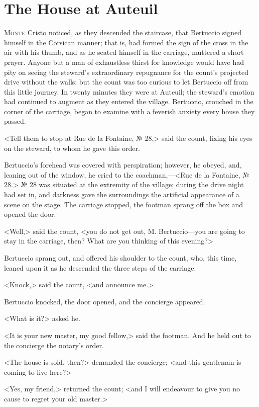 \chapter{The House at Auteuil} 

 \lettrine{M}{onte} Cristo noticed, as they descended the staircase, that Bertuccio signed himself in the Corsican manner; that is, had formed the sign of the cross in the air with his thumb, and as he seated himself in the carriage, muttered a short prayer. Anyone but a man of exhaustless thirst for knowledge would have had pity on seeing the steward's extraordinary repugnance for the count's projected drive without the walls; but the count was too curious to let Bertuccio off from this little journey. In twenty minutes they were at Auteuil; the steward's emotion had continued to augment as they entered the village. Bertuccio, crouched in the corner of the carriage, began to examine with a feverish anxiety every house they passed. 

 <Tell them to stop at Rue de la Fontaine, № 28,> said the count, fixing his eyes on the steward, to whom he gave this order. 

 Bertuccio's forehead was covered with perspiration; however, he obeyed, and, leaning out of the window, he cried to the coachman,—<Rue de la Fontaine, № 28.> № 28 was situated at the extremity of the village; during the drive night had set in, and darkness gave the surroundings the artificial appearance of a scene on the stage. The carriage stopped, the footman sprang off the box and opened the door. 

 <Well,> said the count, <you do not get out, M. Bertuccio—you are going to stay in the carriage, then? What are you thinking of this evening?> 

 Bertuccio sprang out, and offered his shoulder to the count, who, this time, leaned upon it as he descended the three steps of the carriage. 

 <Knock,> said the count, <and announce me.> 

 Bertuccio knocked, the door opened, and the concierge appeared. 

 <What is it?> asked he. 

 <It is your new master, my good fellow,> said the footman. And he held out to the concierge the notary's order. 

 <The house is sold, then?> demanded the concierge; <and this gentleman is coming to live here?> 

 <Yes, my friend,> returned the count; <and I will endeavour to give you no cause to regret your old master.> 

